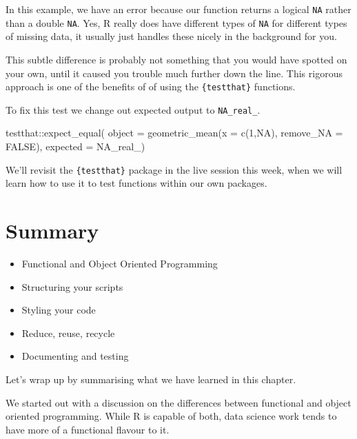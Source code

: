\documentclass[
  letterpaper,
  DIV=11,
  numbers=noendperiod]{scrreprt}
\newenvironment{Shaded}{\begin{snugshade}}{\end{snugshade}}
\newcommand{\AttributeTok}[1]{\textcolor[rgb]{0.40,0.45,0.13}{#1}}
\newcommand{\ConstantTok}[1]{\textcolor[rgb]{0.56,0.35,0.01}{#1}}
\newcommand{\DecValTok}[1]{\textcolor[rgb]{0.68,0.00,0.00}{#1}}
\newcommand{\FunctionTok}[1]{\textcolor[rgb]{0.28,0.35,0.67}{#1}}
\newcommand{\NormalTok}[1]{\textcolor[rgb]{0.00,0.23,0.31}{#1}}
\newcommand{\SpecialCharTok}[1]{\textcolor[rgb]{0.37,0.37,0.37}{#1}}
\providecommand{\tightlist}{%
  \setlength{\itemsep}{0pt}\setlength{\parskip}{0pt}}\usepackage{longtable,booktabs,array}
\begin{document}
In this example, we have an error because our function returns a logical
\texttt{NA} rather than a double \texttt{NA}. Yes, R really does have
different types of \texttt{NA} for different types of missing data, it
usually just handles these nicely in the background for you.

This subtle difference is probably not something that you would have
spotted on your own, until it caused you trouble much further down the
line. This rigorous approach is one of the benefits of of using the
\texttt{\{testthat\}} functions.

To fix this test we change out expected output to \texttt{NA\_real\_}.

\begin{Shaded}
\begin{Highlighting}[]
\NormalTok{testthat}\SpecialCharTok{::}\FunctionTok{expect\_equal}\NormalTok{(}
  \AttributeTok{object =} \FunctionTok{geometric\_mean}\NormalTok{(}\AttributeTok{x =} \FunctionTok{c}\NormalTok{(}\DecValTok{1}\NormalTok{,}\ConstantTok{NA}\NormalTok{), }\AttributeTok{remove\_NA =} \ConstantTok{FALSE}\NormalTok{),}
  \AttributeTok{expected =} \ConstantTok{NA\_real\_}\NormalTok{)}
\end{Highlighting}
\end{Shaded}

We'll revisit the \texttt{\{testthat\}} package in the live session this
week, when we will learn how to use it to test functions within our own
packages.

\section{Summary}\label{summary-1}

\begin{itemize}
\tightlist
\item
  Functional and Object Oriented Programming
\item
  Structuring your scripts
\item
  Styling your code
\item
  Reduce, reuse, recycle
\item
  Documenting and testing
\end{itemize}

Let's wrap up by summarising what we have learned in this chapter.

We started out with a discussion on the differences between functional
and object oriented programming. While R is capable of both, data
science work tends to have more of a functional flavour to it.
\end{document}
